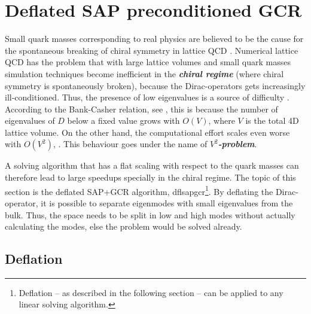 \documentclass{article}
\theoremstyle{plain} %
\theoremstyle{convention} %
\theoremstyle{remark} %
\def\df#1{\textbf{\textit{#1}}}
\numberwithin{equation}{section}
\begin{document}
\newpage

\section{Deflated SAP preconditioned GCR}

\label{sec:dfl_sap_gcr}

Small quark masses corresponding to real physics are believed to be the cause for the spontaneous breaking of chiral symmetry in lattice QCD \cite{banks1980}. Numerical lattice QCD has the problem that with large lattice volumes and small quark masses simulation techniques become inefficient in the \df{chiral regime} (where chiral symmetry is spontaneously broken), because the Dirac-operators gets increasingly ill-conditioned. Thus, the presence of low eigenvalues is a source of difficulty \cite{giusti2003}. According to the Bank-Casher relation, see \cite{banks1980}, this is because the number of eigenvalues of $D$ below a fixed value grows with $O(V)$, where $V$ is the total 4D lattice volume. On the other hand, the computational effort scales even worse with $O(V^2)$, \cite{luscher2007}. This behaviour goes under the name of \df{$V^2$-problem}.

A solving algorithm that has a flat scaling with respect to the quark masses can therefore lead to large speedups specially in the chiral regime. The topic of this section is the deflated SAP+GCR algorithm, \acrshort{dflsapgcr}\footnote{Deflation -- as described in the following section -- can be applied to any linear solving algorithm.}. By deflating the Dirac-operator, it is possible to separate eigenmodes with small eigenvalues from the bulk. Thus, the space needs to be split in low and high modes without actually calculating the modes, else the problem would be solved already.

\subsection{Deflation}

\label{sec:deflation}
\end{document}
